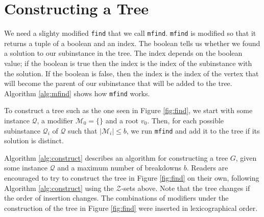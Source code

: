 \section{Constructing a Tree}
\label{sec:construction}
We need a slighty modified \texttt{find} that we call \texttt{mfind}.
\texttt{mfind} is modified so that it returns a tuple of a boolean and an
index.
The boolean tells us whether we found a solution to our subinstance in the
tree.
The index depends on the boolean value; if the boolean is true then the index
is the index of the subinstance with the solution.
If the boolean is false, then the index is the index of the vertex that will
become the parent of our subinstance that will be added to the tree.
Algorithm \ref{alg:mfind} shows how \texttt{mfind} works.


To construct a tree such as the one seen in Figure \ref{fig:find}, we start
with some instance $\mathcal{Q}$, a modifier $\mathcal{M}_0 = \{ {} \}$ and
a root $v_0$.
Then, for each possible subinstance $\mathcal{Q}_i$ of $\mathcal{Q}$ such that
$|\mathcal{M}_i| \leq b$, we run \texttt{mfind} and add it to the tree if its
solution is distinct.


Algorithm \ref{alg:construct} describes an algorithm for constructing a tree
$G$, given some instance $\mathcal{Q}$ and a maximum number of breakdowns $b$.
Readers are encouraged to try to construct the tree in Figure \ref{fig:find} on
their own, following Algorithm \ref{alg:construct} using the
$\mathcal{Z}$-sets above. Note that the tree changes if the order of insertion
changes. The combinations of modifiers under the construction of the tree in
Figure \ref{fig:find} were inserted in lexicographical order.
